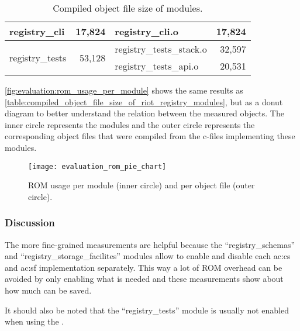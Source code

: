 \begin{table}[H]
\begin{tabular}{|l|r|l|r|}
        \hline
        registry\_cli                              & 17,824                    & registry\_cli.o                     & 17,824                    \\

        \hline
        \multirow{2}{*}{registry\_tests}           & \multirow{2}{*}{53,128}   & registry\_tests\_stack.o            &
        32,597                                                                                                                                   \\
        \cline{3-4}
                                                   &                           & registry\_tests\_api.o              & 20,531                    \\
        \hline
    \end{tabular}
    \caption{Compiled object file size of  modules.}
    \label{table:compiled_object_file_size_of_riot_registry_modules}
\end{table}

\autoref{fig:evaluation:rom_usage_per_module} shows the same results as \autoref{table:compiled_object_file_size_of_riot_registry_modules}, but as a donut diagram to better understand the relation between the measured objects.
The inner circle represents the  modules and the outer circle represents the corresponding object files that were compiled from the c-files implementing these modules.

\begin{figure}[H]
    \centering
    \texttt{[image: evaluation\_rom\_pie\_chart]}
    \caption{ ROM usage per module (inner circle) and per object file (outer circle).}
    \label{fig:evaluation:rom_usage_per_module}
\end{figure}

\subsubsection{Discussion}

The more fine-grained measurements are helpful because the ``registry\_schemas'' and ``registry\_storage\_facilites'' modules allow to enable and disable each \gls{ac:cs} and \gls{ac:sf} implementation separately.
This way a lot of ROM overhead can be avoided by only enabling what is needed and these measurements show about how much can be saved.

It should also be noted that the ``registry\_tests'' module is usually not enabled when using the .